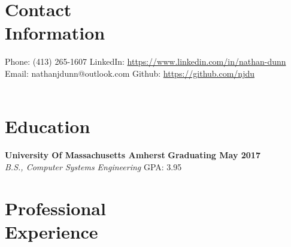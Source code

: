\documentclass[margin,line]{resume}
\begin{document}
\begin{resume}
    \section{\mysidestyle Contact\\Information}

    Phone: (413) 265-1607 \tabto{6cm} LinkedIn: \hfill \url{https://www.linkedin.com/in/nathan-dunn}\\
    Email: nathanjdunn@outlook.com \tabto{6cm}  Github: \hfill \url{https://github.com/njdu}\\
    \vspace{0mm}\\\vspace{-1cm}

    \section{\mysidestyle Education}

    \textbf{University Of Massachusetts Amherst} \hfill \textbf{Graduating May 2017}\\
    \textsl{B.S., Computer Systems Engineering} \hfill
    GPA: 3.95


    \section{\mysidestyle Professional\\Experience}


\end{resume}
\end{document}
